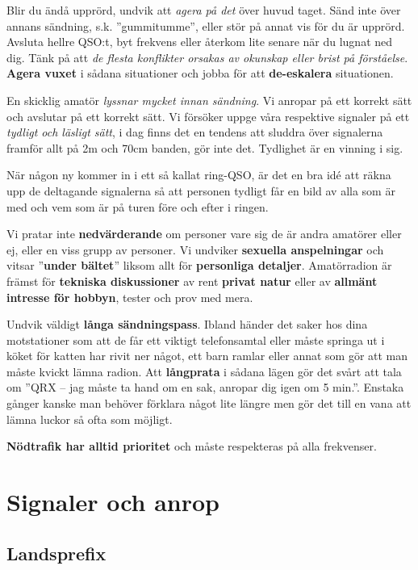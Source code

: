 Blir du ändå upprörd, undvik att \emph{agera på det} över huvud taget. Sänd
inte över annans sändning, s.k. ''gummitumme'', eller stör på annat vis för du
är upprörd. Avsluta hellre QSO:t, byt frekvens eller återkom lite senare när
du lugnat ned dig. Tänk på att \textit{de flesta konflikter orsakas av
okunskap eller brist på förståelse}. \textbf{Agera vuxet} i sådana situationer
och jobba för att \textbf{de-eskalera} situationen.

En skicklig amatör \textit{lyssnar mycket innan sändning}. Vi anropar på ett
korrekt sätt och avslutar på ett korrekt sätt. Vi försöker uppge våra
respektive signaler på ett \emph{tydligt och läsligt sätt}, i dag finns det en
tendens att sluddra över signalerna framför allt på 2m och 70cm banden, gör
inte det. Tydlighet är en vinning i sig.

När någon ny kommer in i ett så kallat ring-QSO, är det en bra idé att räkna
upp de deltagande signalerna så att personen tydligt får en bild av alla som
är med och vem som är på turen före och efter i ringen.

Vi pratar inte \textbf{nedvärderande} om personer vare sig de är andra amatörer
eller ej, eller en viss grupp av personer. Vi undviker \textbf{sexuella
anspelningar} och vitsar ''\textbf{under bältet}'' liksom allt för
\textbf{personliga detaljer}. Amatörradion är främst för \textbf{tekniska
diskussioner} av rent \textbf{privat natur} eller av \textbf{allmänt intresse
för hobbyn}, tester och prov med mera.

Undvik väldigt \textbf{långa sändningspass}. Ibland händer det saker hos dina
motstationer som att de får ett viktigt telefonsamtal eller måste springa ut i
köket för katten har rivit ner något, ett barn ramlar eller annat som gör att
man måste kvickt lämna radion. Att \textbf{långprata} i sådana lägen gör det
svårt att tala om ''QRX -- jag måste ta hand om en sak, anropar dig igen om 5
min.''. Enstaka gånger kanske man behöver förklara något lite längre men gör
det till en vana att lämna luckor så ofta som möjligt.

\textbf{Nödtrafik har alltid prioritet} och måste respekteras på alla
frekvenser.

\clearpage

\section{Signaler och anrop}

\subsection{Landsprefix}

